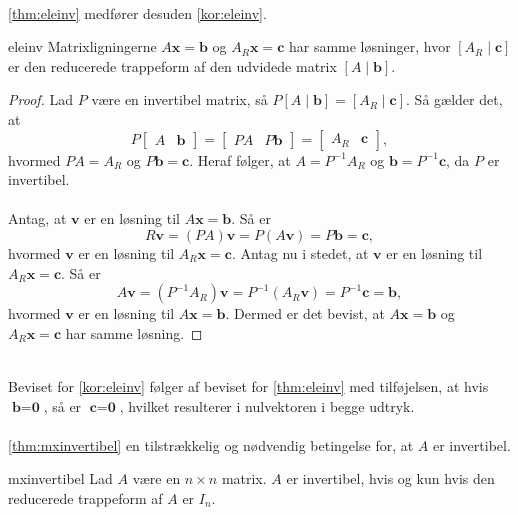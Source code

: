 %
\\
\ref{thm:eleinv} medfører desuden \ref{kor:eleinv}.
\begin{kor}{}{eleinv}
Matrixligningerne $A\textbf{x}=\textbf{b}$ og $A_R\textbf{x}=\textbf{c}$ har samme løsninger, hvor 
$[A_R \mid \textbf{c}]$
er den reducerede trappeform af den udvidede matrix 
$[A \mid\textbf{b}].$
\end{kor}\noindent
%
\begin{proof}
Lad $P$ være en invertibel matrix, så 
$P[A \mid\textbf{b}]
=
[A_R \mid \textbf{c}]
$.
Så gælder det, at 
$$
P
\begin{bmatrix}
A & \textbf{b}
\end{bmatrix}
=
\begin{bmatrix}
PA & P\textbf{b}
\end{bmatrix}
=
\begin{bmatrix}
A_R & \textbf{c}
\end{bmatrix},
$$
hvormed $PA=A_R$ og $P\textbf{b}=\textbf{c}$.
Heraf følger, at $A=P^{-1}A_R$ og $\textbf{b}=P^{-1}\textbf{c}$, da $P$ er invertibel. 
\\\\
Antag, at $\textbf{v}$ er en løsning til $A\textbf{x}=\textbf{b}$. Så er
$$
R\textbf{v}=(PA)\textbf{v}=P(A\textbf{v})=P\textbf{b}=\textbf{c},
$$
hvormed $\textbf{v}$ er en løsning til $A_R\textbf{x}=\textbf{c}$. 
Antag nu i stedet, at $\textbf{v}$ er en løsning til $A_R\textbf{x}=\textbf{c}$. Så er
$$
A\textbf{v}=(P^{-1}A_R)\textbf{v}=P^{-1}(A_R\textbf{v})=P^{-1}\textbf{c}=\textbf{b},
$$
hvormed $\textbf{v}$ er en løsning til $A\textbf{x}=\textbf{b}$. 
Dermed er det bevist, at $A\textbf{x}=\textbf{b}$ og $A_R\textbf{x}=\textbf{c}$ har samme løsning.

\end{proof}
\\
Beviset for \ref{kor:eleinv} følger af beviset for \ref{thm:eleinv} med tilføjelsen, at hvis $\textbf{b}=\textbf{0}$, så er $\textbf{c}=\textbf{0}$, hvilket resulterer i nulvektoren i begge udtryk.\\\\
%
\ref{thm:mxinvertibel}  en tilstrækkelig og nødvendig betingelse for, at $A$ er invertibel.
%
\begin{thm}{}{mxinvertibel}
Lad $A$ være en $n \times n$ matrix. 
$A$ er invertibel, hvis og kun hvis den reducerede trappeform af $A$ er $I_n$.
\end{thm}
%
